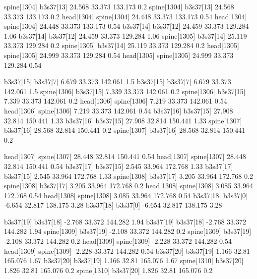 spine[1304]    b3s37[13]    24.568    33.373    133.173    0.2
spine[1304]    b3s37[13]    24.568    33.373    133.173    0.2
head[1304]    spine[1304]    24.448    33.373    133.173    0.54
head[1304]    spine[1304]    24.448    33.373    133.173    0.54
b3s37[14]    b3s37[12]    24.459    33.373    129.284    1.06
b3s37[14]    b3s37[12]    24.459    33.373    129.284    1.06
spine[1305]    b3s37[14]    25.119    33.373    129.284    0.2
spine[1305]    b3s37[14]    25.119    33.373    129.284    0.2
head[1305]    spine[1305]    24.999    33.373    129.284    0.54
head[1305]    spine[1305]    24.999    33.373    129.284    0.54


b3s37[15]    b3s37[7]    6.679    33.373    142.061    1.5
b3s37[15]    b3s37[7]    6.679    33.373    142.061    1.5
spine[1306]    b3s37[15]    7.339    33.373    142.061    0.2
spine[1306]    b3s37[15]    7.339    33.373    142.061    0.2
head[1306]    spine[1306]    7.219    33.373    142.061    0.54
head[1306]    spine[1306]    7.219    33.373    142.061    0.54
b3s37[16]    b3s37[15]    27.908    32.814    150.441    1.33
b3s37[16]    b3s37[15]    27.908    32.814    150.441    1.33
spine[1307]    b3s37[16]    28.568    32.814    150.441    0.2
spine[1307]    b3s37[16]    28.568    32.814    150.441    0.2


head[1307]    spine[1307]    28.448    32.814    150.441    0.54
head[1307]    spine[1307]    28.448    32.814    150.441    0.54
b3s37[17]    b3s37[15]    2.545    33.964    172.768    1.33
b3s37[17]    b3s37[15]    2.545    33.964    172.768    1.33
spine[1308]    b3s37[17]    3.205    33.964    172.768    0.2
spine[1308]    b3s37[17]    3.205    33.964    172.768    0.2
head[1308]    spine[1308]    3.085    33.964    172.768    0.54
head[1308]    spine[1308]    3.085    33.964    172.768    0.54
b3s37[18]    b3s37[0]    -6.654    32.817    138.175    3.28
b3s37[18]    b3s37[0]    -6.654    32.817    138.175    3.28


b3s37[19]    b3s37[18]    -2.768    33.372    144.282    1.94
b3s37[19]    b3s37[18]    -2.768    33.372    144.282    1.94
spine[1309]    b3s37[19]    -2.108    33.372    144.282    0.2
spine[1309]    b3s37[19]    -2.108    33.372    144.282    0.2
head[1309]    spine[1309]    -2.228    33.372    144.282    0.54
head[1309]    spine[1309]    -2.228    33.372    144.282    0.54
b3s37[20]    b3s37[19]    1.166    32.81    165.076    1.67
b3s37[20]    b3s37[19]    1.166    32.81    165.076    1.67
spine[1310]    b3s37[20]    1.826    32.81    165.076    0.2
spine[1310]    b3s37[20]    1.826    32.81    165.076    0.2


